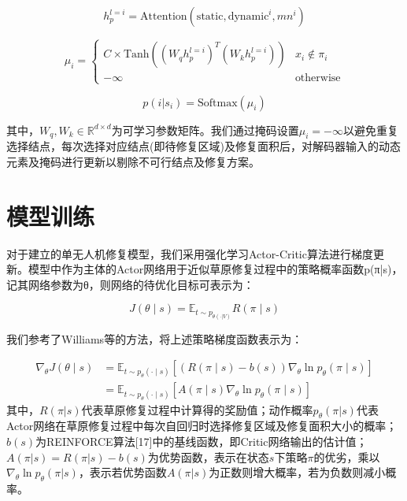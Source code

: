 \documentclass[AutoFakeBold]{LZUThesis}
\begin{document}
\begin{equation}
	h_{p}^{l=i} = \text{Attention}(\text{static}, \text{dynamic}^{i}, mn^{i})
	\label{eq:15a}
\end{equation}

\begin{equation}
	\mu_{i} =
	\begin{cases}
		C \times \text{Tanh}\left((W_{q}h_{p}^{l=i})^{T}(W_{k}h_{p}^{l=i})\right) & x_{i} \notin \pi_{i} \\
		-\infty                                                                   & \text{otherwise}
	\end{cases}
	\label{eq:15b}
\end{equation}

\begin{equation}
	p(i|s_{i}) = \text{Softmax}(\mu_{i})
	\label{eq:15c}
\end{equation}

其中，$W_q,W_k\in\mathbb{R}^{d\times d}$为可学习参数矩阵。我们通过掩码设置$\mu_i=-\infty$以避免重复选择结点，每次选择对应结点(即待修复区域)及修复面积后，对解码器输入的动态元素及掩码进行更新以剔除不可行结点及修复方案。

\section{模型训练}
对于建立的单无人机修复模型，我们采用强化学习Actor-Critic算法\cite{sutton1999policy}进行梯度更新。模型中作为主体的Actor网络用于近似草原修复过程中的策略概率函数p(π|s)，记其网络参数为θ，则网络的待优化目标可表示为：

\begin{equation}
	J(\theta \mid s) = \mathbb{E}_{t \sim p_{\theta(\cdot | V)}} R(\pi \mid s)
	\label{eq:16}
\end{equation}

我们参考了Williams等的方法\cite{williams1992simple}，将上述策略梯度函数表示为：

\begin{align}
	\nabla_{\theta}J(\theta \mid s)
	 & = \mathbb{E}_{t \sim p_{\theta}(\cdot \mid s)} \left[(R(\pi \mid s) - b(s)) \nabla_{\theta} \ln p_{\theta}(\pi \mid s)\right] \label{eq:17a} \\
	 & = \mathbb{E}_{t \sim p_{\theta}(\cdot \mid s)} \left[A(\pi \mid s) \nabla_{\theta} \ln p_{\theta}(\pi \mid s)\right] \label{eq:17b}
\end{align}
其中，$R(\pi|s)$代表草原修复过程中计算得的奖励值；动作概率$p_\theta(\pi|s)$代表Actor网络在草原修复过程中每次自回归时选择修复区域及修复面积大小的概率；$b(s)$为REINFORCE算法[17]中的基线函数，即Critic网络输出的估计值；$A(\pi|s)=R(\pi|s)-b(s)$为优势函数，表示在状态$s$下策略$\pi$的优劣，乘以$\nabla_\theta\ln p_\theta(\pi|s)$，表示若优势函数$A(\pi|s)$为正数则增大概率，若为负数则减小概率。
\end{document}
